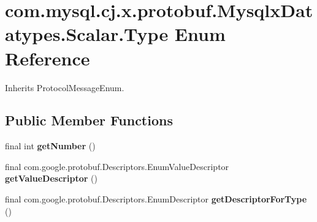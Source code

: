 \hypertarget{enumcom_1_1mysql_1_1cj_1_1x_1_1protobuf_1_1_mysqlx_datatypes_1_1_scalar_1_1_type}{}\section{com.\+mysql.\+cj.\+x.\+protobuf.\+Mysqlx\+Datatypes.\+Scalar.\+Type Enum Reference}
\label{enumcom_1_1mysql_1_1cj_1_1x_1_1protobuf_1_1_mysqlx_datatypes_1_1_scalar_1_1_type}


Inherits Protocol\+Message\+Enum.

\subsection*{Public Member Functions}
\begin{DoxyCompactItemize}
\item 
\mbox{\label{enumcom_1_1mysql_1_1cj_1_1x_1_1protobuf_1_1_mysqlx_datatypes_1_1_scalar_1_1_type_a9ffe04e2f26f9aa66740e34032c6222a}} 
final int {\bfseries get\+Number} ()
\item 
\mbox{\label{enumcom_1_1mysql_1_1cj_1_1x_1_1protobuf_1_1_mysqlx_datatypes_1_1_scalar_1_1_type_a00dfa1b910b67af98206e59eb23fbdc9}} 
final com.\+google.\+protobuf.\+Descriptors.\+Enum\+Value\+Descriptor {\bfseries get\+Value\+Descriptor} ()
\item 
\mbox{\label{enumcom_1_1mysql_1_1cj_1_1x_1_1protobuf_1_1_mysqlx_datatypes_1_1_scalar_1_1_type_a2ee294138ece39ebee5ed110bf7a9d81}} 
final com.\+google.\+protobuf.\+Descriptors.\+Enum\+Descriptor {\bfseries get\+Descriptor\+For\+Type} ()
\end{DoxyCompactItemize}
